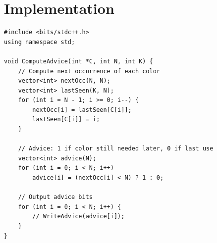 \documentclass[11pt,a4paper]{article}
\begin{document}
\section{Implementation}

\begin{lstlisting}
#include <bits/stdc++.h>
using namespace std;

void ComputeAdvice(int *C, int N, int K) {
    // Compute next occurrence of each color
    vector<int> nextOcc(N, N);
    vector<int> lastSeen(K, N);
    for (int i = N - 1; i >= 0; i--) {
        nextOcc[i] = lastSeen[C[i]];
        lastSeen[C[i]] = i;
    }

    // Advice: 1 if color still needed later, 0 if last use
    vector<int> advice(N);
    for (int i = 0; i < N; i++)
        advice[i] = (nextOcc[i] < N) ? 1 : 0;

    // Output advice bits
    for (int i = 0; i < N; i++) {
        // WriteAdvice(advice[i]);
    }
}
\end{lstlisting}
\end{document}
